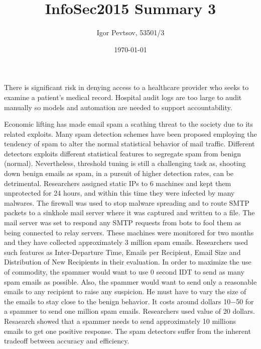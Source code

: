 \documentclass[14pt]{article}
\title{InfoSec2015 Summary 3}
\date{\today}
\author{Igor Pevtsov, 53501/3}
\begin{document}
  	\maketitle

	There is signiﬁcant risk in denying access to a healthcare provider who seeks to examine a patient’s medical record. Hospital audit logs are too large to audit manually so models and automation are needed to support accountability. 

	Economic lifting has made email spam a scathing threat to the society due to its related exploits. Many spam detection schemes have been proposed employing the tendency of spam to alter the normal statistical behavior of mail traﬃc. Diﬀerent detectors exploits diﬀerent statistical features to segregate spam from benign (normal). Nevertheless, threshold tuning is still a challenging task as, shooting down benign emails as spam, in a pursuit of higher detection rates, can be detrimental. Researchers assigned static IPs to 6 machines and kept them unprotected for 24 hours, and within this time they were infected by many malwares. The ﬁrewall was used to stop malware spreading and to route SMTP packets to a sinkhole mail server where it was captured and written to a ﬁle. The mail server was set to respond any SMTP requests from bots to fool them as being connected to relay servers. These machines were monitored for two months and they have collected approximately 3 million spam emails. Researchers used such features as Inter-Departure Time, Emails per Recipient, Email Size and Distribution of New Recipients in their evaluation. In order to maximize the use of commodity, the spammer would want to use 0 second IDT to send as many spam emails as possible. Also, the spammer would want to send only a reasonable emails to any recipient to raise any suspicion. He must have to vary the size of the emails to stay close to the benign behavior. It costs around dollars 10−50 for a spammer to send one million spam emails. Researchers used value of 20 dollars. Resaearch showed that a spammer needs to send approximately 10 millions emails to get one positive response. The spam detectors suﬀer from the inherent tradeoﬀ between accuracy and eﬃciency. 
\end{document}
